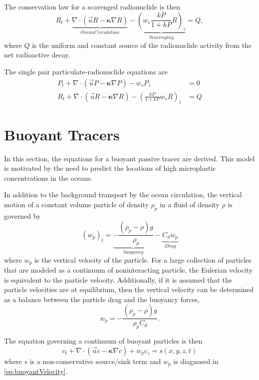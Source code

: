 \documentclass{softwaremanual}
\begin{document}
The conservation law for a scavenged radionuclide is then
\begin{equation}
R_t + \underbrace{\nabla \cdot ( \vec{u} R - \boldsymbol{\kappa} \nabla R ) }_{Ocean Circulation} - \underbrace{\left( w_s \frac{k P}{1 + k P} R \right)_z }_{Scavenging} = Q,
\end{equation}
where $Q$ is the uniform and constant source of the radionuclide activity from the net radioactive decay.

The single pair particulate-radionuclide equations are
\begin{subequations}
\begin{align}
   P_t +\nabla \cdot ( \vec{u} P - \boldsymbol{\kappa} \nabla P )  - w_s P_z &= 0 \\
   R_t + \nabla \cdot ( \vec{u} R - \boldsymbol{\kappa} \nabla R ) - \left( \frac{kP}{1 + kP}w_s R \right)_z &= Q 
\end{align} 
\end{subequations}


\section{Buoyant Tracers}
In this section, the equations for a buoyant passive tracer are derived. This model is motivated by the need to predict the locations of high microplastic concentrations in the oceans.

In addition to the background transport by the ocean circulation, the vertical motion of a constant volume particle of density $\rho_p$ in a fluid of density $\rho$ is governed by
\begin{equation}
(w_p)_t = \underbrace{-\frac{(\rho_p - \rho)g}{\rho_p}}_{buoyancy} - \underbrace{C_d w_p}_{Drag} 
\end{equation}
where $w_p$ is the vertical velocity of the particle. For a large collection of particles that are modeled as a continuum of noninteracting particle, the Eulerian velocity is equivalent to the particle velocity. Additionally, if it is assumed that the particle velocities are at equilibrium, then the vertical velocity can be determined as a balance between the particle drag and the buoyancy forces,
\begin{equation}
w_p = -\frac{(\rho_p - \rho)g}{\rho_p C_d}. \label{eq:buoyantVelocity}
\end{equation}

The equation governing a continuum of buoyant particles is then
\begin{equation}
c_t + \nabla \cdot ( \vec{u} c - \boldsymbol{\kappa} \nabla c ) + w_p c_z = s(x,y,z,t)
\end{equation}
where $s$ is a non-conservative source/sink term and $w_p$ is diagnosed in \eqref{eq:buoyantVelocity}.

\pagebreak



\end{document}
